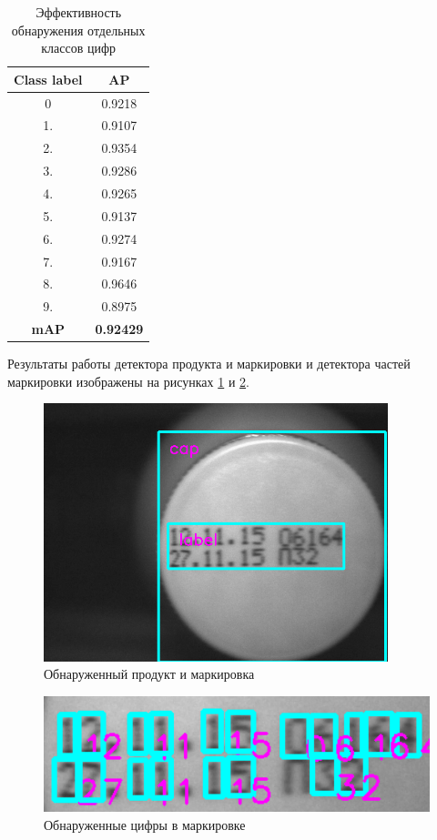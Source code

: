 \documentclass{thesisby}
\begin{document}
\begin{table}[h]
\caption{Эффективность обнаружения отдельных классов цифр}
\centering
\begin{tabular}{ | c | c |  }
\hline
Class label & AP \\ \hline
0 & 0.9218\\
1. & 0.9107\\
2. & 0.9354\\
3. & 0.9286\\
4. & 0.9265\\
5. & 0.9137\\
6. & 0.9274\\
7. & 0.9167\\
8. & 0.9646\\
9. & 0.8975\\
\hline
\textbf{mAP} & \textbf{0.92429}\\
\hline
\end{tabular}
\label{tab:efficiency_detector1}
\end{table}

Результаты работы детектора продукта и маркировки и детектора частей маркировки изображены на рисунках \ref{fig:product_detect}  и \ref{fig:numbers_detect}.

\begin{figure}[!ht]
	\centering
	\includegraphics[width=10cm]{man-source/images/ch4/pic4-25.png}
	\caption{Обнаруженный продукт и маркировка}
	\label{fig:product_detect}
\end{figure}

\begin{figure}[!ht]
	\centering
	\includegraphics[width=12cm]{man-source/images/ch4/pic4-26.png}
	\caption{Обнаруженные цифры в маркировке}
	\label{fig:numbers_detect}
\end{figure}
\end{document}
